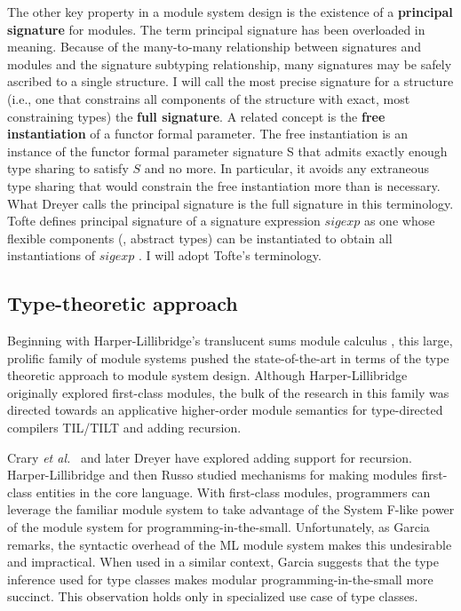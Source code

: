 \documentclass[12pt]{article}
\newcommand{\etal}{{\it et al.}}
\begin{document}
The other key property in a module system design is the existence of a {\bf principal signature} for modules. The term principal signature has been overloaded in meaning. Because of the many-to-many relationship between signatures and modules and the signature subtyping relationship, many signatures may be safely ascribed to a single structure. I will call the most precise signature for a structure (i.e., one that constrains all components of the structure with exact, most constraining types) the {\bf full signature}. A related concept is the {\bf free instantiation} of a functor formal parameter. The free instantiation is an instance of the functor formal parameter signature S that admits exactly enough type sharing to satisfy $S$ and no more. In particular, it avoids any extraneous type sharing that would constrain the free instantiation more than is necessary. What Dreyer\cite{dreyerthesis} calls the principal signature is the full signature in this terminology. Tofte defines principal signature of a signature expression $sigexp$ as one whose flexible components (\ie, abstract types) can be instantiated to obtain all instantiations of $sigexp$ \cite{tofte92,mthm97}. I will adopt Tofte's terminology. 
 
\subsection{Type-theoretic approach}
Beginning with Harper-Lillibridge's translucent sums module calculus \cite{lillibridge94}, this large, prolific family of module systems pushed the state-of-the-art in terms of the type theoretic approach to module system design. Although Harper-Lillibridge originally explored first-class modules, the bulk of the research in this family was directed towards an applicative higher-order module semantics for type-directed compilers TIL/TILT and adding recursion. 

Crary \etal~\cite{crary99} and later Dreyer \cite{dreyer04,dreyer07} have explored adding support for recursion. Harper-Lillibridge \cite{lillibridge94} and then Russo \cite{russo00} studied mechanisms for making modules first-class entities in the core language. With first-class modules, programmers can leverage the familiar module system to take advantage of the System F-like power of the module system for programming-in-the-small. Unfortunately, as Garcia \cite{garcia05:extendedcomparing05} remarks, the syntactic overhead of the ML module system makes this undesirable and impractical. When used in a similar context, Garcia suggests that the type inference used for type classes makes modular programming-in-the-small more succinct. This observation holds only in specialized use case of type classes. 
\end{document}
